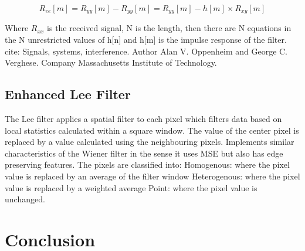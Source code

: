 \documentclass[%
reprint,
showpacs,preprintnumbers,
bibnotes,
amsmath,amssymb,
aps,
pra,
]{revtex4-1}
\begin{document}
$$R_{ee}[m]=R_{yy}[m]-R_{yy}[m] = R_{yy}[m]-h[m] \times R_{xy}[m]$$

Where $R_{xx}$ is the received signal, N is the length, then there are N equations in the N unrestricted values of h[n] and h[m] is the impulse response of the filter.
cite: Signals, systems, interference. Author Alan V. Oppenheim and George C. Verghese. Company Massachusetts Institute of Technology.

\subsection{\label{sec:level2} Enhanced Lee Filter}
The Lee filter applies a spatial filter to each pixel which filters data based on local statistics calculated within a square window. The value of the center pixel is replaced by a value calculated using the neighbouring pixels. Implements similar characteristics of the Wiener filter in the sense it uses MSE but also has edge preserving features. The pixels are classified into:
Homogenous: where the pixel value is replaced by an average of the filter window
Heterogenous: where the pixel value is replaced by a weighted average
Point: where the pixel value is unchanged.



	\section{\label{sec:level1} Conclusion}





	
\end{document}
